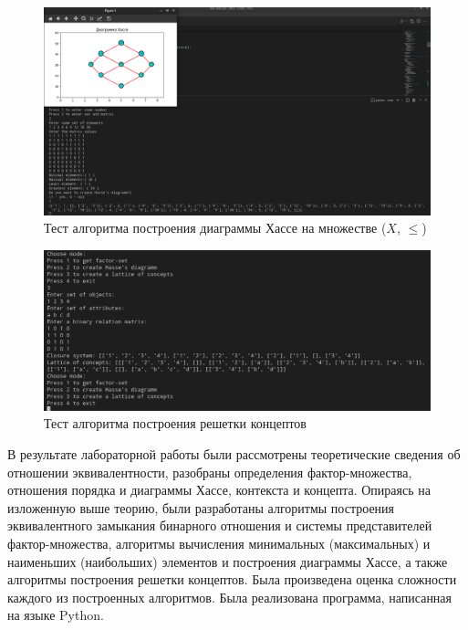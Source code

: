 \documentclass[bachelor, och, labwork]{shiza}
\begin{document}
        \begin{figure}[H]
            \centering
            \includegraphics[width=1\textwidth]{photo/3.png}
            \caption{Тест алгоритма построения диаграммы Хассе на множестве ($X$, $\leq$)}
        \end{figure}

        \begin{figure}[H]
            \centering
            \includegraphics[width=1\textwidth]{photo/4.png}
            \caption{Тест алгоритма построения решетки концептов}
        \end{figure} 
    \newpage
 
    \conclusion
    
    В результате лабораторной работы были рассмотрены теоретические сведения об отношении эквивалентности, разобраны
    определения фактор-множества, отношения порядка и диаграммы Хассе, контекста и концепта. Опираясь на изложенную
    выше теорию, были разработаны алгоритмы построения эквивалентного замыкания бинарного отношения и системы представителей
    фактор-множества, алгоритмы вычисления минимальных (максимальных) и наименьших (наибольших) элементов и построения
    диаграммы Хассе, а также алгоритмы построения решетки концептов. Была произведена оценка сложности каждого из 
    построенных алгоритмов. Была реализована программа, написанная на языке Python.
    
\end{document}
